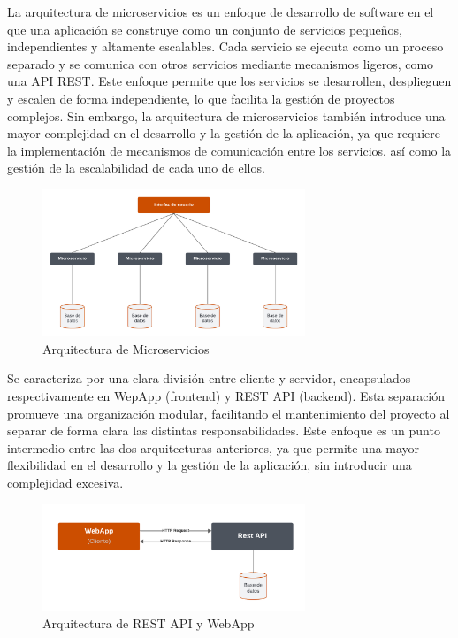 La arquitectura de microservicios es un enfoque de desarrollo de software en el que una aplicación se construye como un conjunto de servicios pequeños, independientes y altamente escalables. Cada servicio se ejecuta como un proceso separado y se comunica con otros servicios mediante mecanismos ligeros, como una API REST.
Este enfoque permite que los servicios se desarrollen, desplieguen y escalen de forma independiente, lo que facilita la gestión de proyectos complejos. Sin embargo, la arquitectura de microservicios también introduce una mayor complejidad en el desarrollo y la gestión de la aplicación, ya que requiere la implementación de mecanismos de comunicación entre los servicios, así como la gestión de la escalabilidad de cada uno de ellos.
\begin{figure}[H]
    \centering
    \includegraphics[width=0.7\textwidth]{figures/4-Estudio-viabilidad/4_Microservicios.png}
    \caption{Arquitectura de Microservicios}
    \label{fig:arquitectura_microservicios}
    \hypertarget{fig:arquitectura_microservicios}{}
\end{figure}

Se caracteriza por una clara división entre cliente y servidor, encapsulados respectivamente en WepApp (frontend) y REST API (backend). Esta separación promueve una organización modular, facilitando el mantenimiento del proyecto al separar de forma clara las distintas responsabilidades. 
Este enfoque es un punto intermedio entre las dos arquitecturas anteriores, ya que permite una mayor flexibilidad en el desarrollo y la gestión de la aplicación, sin introducir una complejidad excesiva. 
\begin{figure}[H]
    \centering
    \includegraphics[width=0.7\textwidth]{figures/4-Estudio-viabilidad/4_WebApp_RestApi.png}
    \caption{Arquitectura de REST API y WebApp}
    \label{fig:arquitectura_rest_api_webapp}
    \hypertarget{fig:arquitectura_rest_api_webapp}{}
\end{figure}

